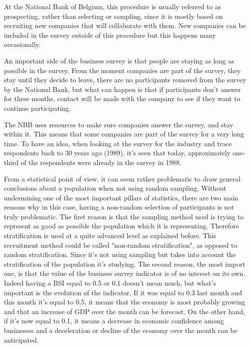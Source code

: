 \documentclass[12pt,a4paper,oneside]{book}
\begin{document}
At the National Bank of Belgium, this procedure is usually referred to as prospecting, rather than selecting or sampling, since it is mostly based on recruiting new companies that will collaborate with them. New companies can be included in the survey outside of this procedure but this happens many occasionally.


An important side of the business survey is that people are staying as long as possible in the survey.
From the moment companies are part of the survey, they stay until they decide to leave, there are no participants removed from the survey by the National Bank, but what can happen is that if participants don't answer for three months, contact will be made with the company to see if they want to continue participating.

The NBB uses resources to make sure companies answer the survey, and stay within it.
This means that some companies are part of the survey for a very long time.
To have an idea, when looking at the survey for the industry and trace respondents back to 30 years ago (1989), it's seen that today, approximately one-third of the respondents were already in the survey in 1988.

From a statistical point of view, it can seem rather problematic to draw general conclusions about a population when not using random sampling.
Without undermining one of the most important pillars of statistics, there are two main reasons why in this case, having a non-random selection of participants is not truly problematic.
The first reason is that the sampling method used is trying to represent as good as possible the population which it is representing. Therefore stratification is used at a quite advanced level as explained before. 
This recruitment method could be called "non-random stratification", as opposed to random stratification. Since it's not using sampling but takes into account the stratification of the population it's studying.
The second reason, the most import one, is that the value of the business survey indicator is of no interest on its own. Indeed having a BSI equal to 0.5 or 0.1 doesn't mean much, but what's important is the evolution of the indicator. If it was equal to 0.3 last month and this month it's equal to 0.5, it means that the economy is most probably growing and that an increase of GDP over the month can be forecast. On the other hand, if it's now equal to 0.1, it means a decrease in economic confidence among businesses and a deceleration or decline of the economy over the month can be anticipated.
\end{document}
